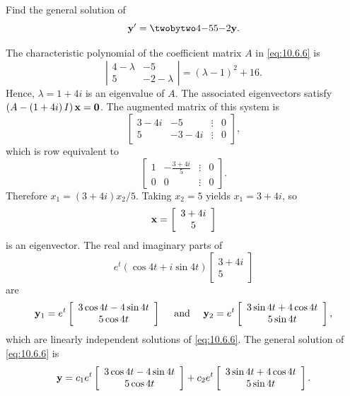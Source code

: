 \setcounter{example}{0}
\setcounter{equation}{5}
\begin{example}
  \label{example:10.6.1} \rm Find the general solution of
  \begin{equation}
    \label{eq:10.6.6}{\bf y}'=\twobytwo4{-5}5{-2}{\bf y}.
  \end{equation}
\end{example}
\begin{examplesolution}
\solution The characteristic polynomial of the coefficient matrix $A$ in \eqref{eq:10.6.6} is
\[
  \left|
  \begin{array}{cc}
    4-\lambda & -5         \\
    5         & -2-\lambda
  \end{array}\right|=(\lambda-1)^{2}+16.
\]
Hence, $\lambda=1+4i$ is an eigenvalue of $A$. The associated eigenvectors satisfy
$\left(A-\left(1+4i\right)I\right){\bf x}={\bf 0}$. The augmented matrix of this system is
\[
  \left[
  \begin{array}{cccr}
    3-4i & -5    & \vdots & 0 \\
    5    & -3-4i & \vdots & 0
  \end{array}\right],
\]
which is row equivalent to
\[
  \left[
  \begin{array}{cccr}
    1 & -\frac{3+4i}{5} & \vdots & 0 \\
    0 & 0               & \vdots & 0
  \end{array}\right].
\]
Therefore $x_{1}=(3+4i)x_{2}/5$. Taking $x_{2}=5$ yields $x_{1}=3+4i$, so
\[
  {\bf x}=\left[
  \begin{array}{c}
    3+4i \\
    5
  \end{array}\right]
\]
is an eigenvector. The real and imaginary parts of
\[
  e^{t}(\cos4t+i\sin4t)\left[
  \begin{array}{c}
    3+4i \\
    5
  \end{array}\right]
\]
are
\[
  {\bf y}_{1}=e^{t}\left[
  \begin{array}{c}
    3\cos4t-4\sin 4t \\
    5\cos4t
  \end{array}\right]\quad\mbox{ and }\quad{\bf y}_{2}=e^{t}\left[
  \begin{array}{c}
    3\sin4t+4\cos4t \\
    5\sin 4t
  \end{array}\right],
\]
which are linearly independent solutions of \eqref{eq:10.6.6}. The general solution of
\eqref{eq:10.6.6} is
\[
  {\bf y}= c_{1}e^{t}\left[
  \begin{array}{c}
    3\cos4t-4\sin 4t \\
    5\cos4t
  \end{array}\right]+ c_{2}e^{t}\left[
  \begin{array}{c}
    3\sin4t+4\cos4t \\
    5\sin 4t
  \end{array}\right].
\]
\end{examplesolution}

